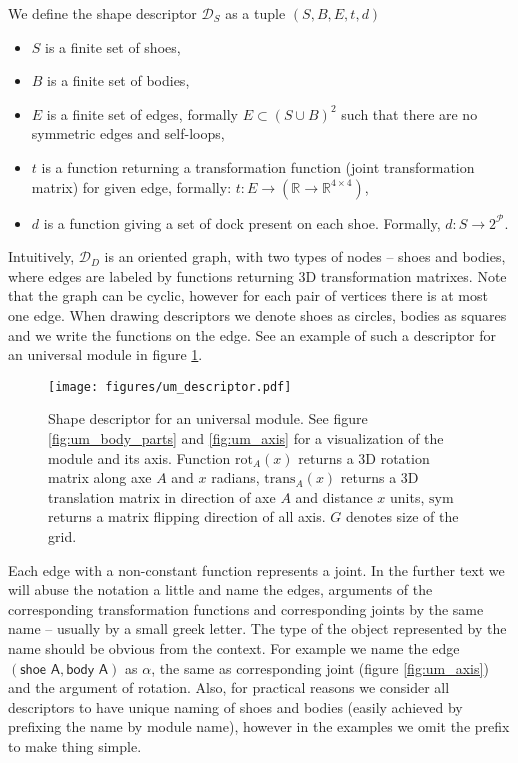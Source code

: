 We define the shape descriptor $\mathcal{D}_S$ as a tuple $(S, B, E, t, d)$
\begin{itemize}
    \item $S$ is a finite set of shoes,
    \item $B$ is a finite set of bodies,
    \item $E$ is a finite set of edges, formally $E \subset (S\cup B)^2$ such
    that there are no symmetric edges and self-loops,
    \item $t$ is a function returning a transformation function (joint
    transformation matrix) for given edge, formally: $t:
    E\rightarrow(\mathds{R}\rightarrow\mathds{R}^{4\times4})$,
    \item $d$ is a function giving a set of dock present on each shoe. Formally,
    $d: S\rightarrow 2^\mathcal{P}$.
\end{itemize}
Intuitively, $\mathcal{D}_D$ is an oriented graph, with two types of nodes --
shoes and bodies, where edges are labeled by functions returning 3D
transformation matrixes. Note that the graph can be cyclic, however for each
pair of vertices there is at most one edge. When drawing descriptors we denote
shoes as circles, bodies as squares and we write the functions on the edge. See
an example of such a descriptor for an universal module in figure
\ref{fig:um_descriptor}.

\begin{figure}[t]
    \centering
    \texttt{[image: figures/um\_descriptor.pdf]}
    \caption{Shape descriptor for an universal module. See figure
    \ref{fig:um_body_parts} and \ref{fig:um_axis} for a visualization of the
    module and its axis. Function $\text{rot}_A(x)$ returns a 3D rotation matrix
    along axe $A$ and $x$ radians, $\text{trans}_A(x)$ returns a 3D translation
    matrix in direction of axe $A$ and distance $x$ units, $\text{sym}$ returns
    a matrix flipping direction of all axis. $G$ denotes size of the grid.}
    \label{fig:um_descriptor}
\end{figure}

Each edge with a non-constant function represents a joint. In the further text
we will abuse the notation a little and name the edges, arguments of the
corresponding transformation functions and corresponding joints by the same name
-- usually by a small greek letter. The type of the object represented by the
name should be obvious from the context. For example we name the edge
$(\textsf{shoe A}, \textsf{body A})$ as $\alpha$, the same as corresponding
joint (figure \ref{fig:um_axis}) and the argument of rotation. Also, for
practical reasons we consider all descriptors to have unique naming of shoes and
bodies (easily achieved by prefixing the name by module name), however in the
examples we omit the prefix to make thing simple.

